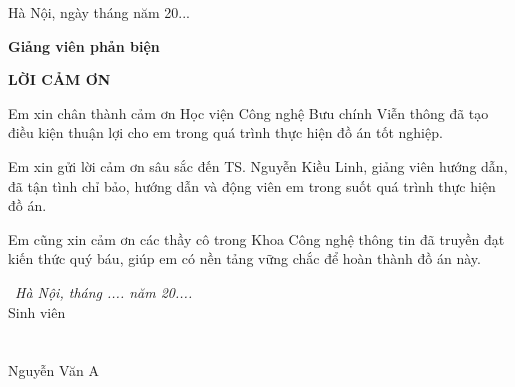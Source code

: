 \documentclass[12pt,a4paper,openany,oneside]{report}
\begin{document}
\begin{flushright}
Hà Nội, ngày \hspace{0.75cm} tháng \hspace{0.75cm} năm 20...\hspace{0.75cm}

{\textbf{\large{Giảng viên phản biện }}} \hspace{1cm} \textcolor{white}{.}
\end{flushright}

\restoregeometry
\pagestyle{fancy}
\fontsize{13pt}{13pt}\selectfont \baselineskip 0.75cm 

\newpage
\thispagestyle{empty}
\tableofcontents

\newpage
\begin{center}
\Large{\textbf{LỜI CẢM ƠN}}\\
\end{center}
\vspace{1cm}

Em xin chân thành cảm ơn Học viện Công nghệ Bưu chính Viễn thông đã tạo điều kiện thuận lợi cho em trong quá trình thực hiện đồ án tốt nghiệp.

Em xin gửi lời cảm ơn sâu sắc đến TS. Nguyễn Kiều Linh, giảng viên hướng dẫn, đã tận tình chỉ bảo, hướng dẫn và động viên em trong suốt quá trình thực hiện đồ án.

Em cũng xin cảm ơn các thầy cô trong Khoa Công nghệ thông tin đã truyền đạt kiến thức quý báu, giúp em có nền tảng vững chắc để hoàn thành đồ án này.

\vspace{1cm}
\phantom{nnnnnnnnnnnnnnnnnnnnnnnnnnnnnnn}\  {\textit{Hà Nội, tháng ....  năm 20....}} \\
\phantom{nnnnnnnnnnnnnnnnnnnnnnnnnnnnnnnnnnnnnnnnn} {Sinh viên}\\
\phantom{nnnnnnnnnnnnnnnnnnnnnnnnnnnnnnnnnn} \\
\phantom{nnnnnnnnnnnnnnnnnnnnnnnnnnnnnnnnnn} \\ 
\phantom{nnnnnnnnnnnnnnnnnnnnnnnnnnnnnnnnnnnnnnn}   {Nguyễn Văn A}

\newpage 
{} 
\listoffigures
\end{document}
